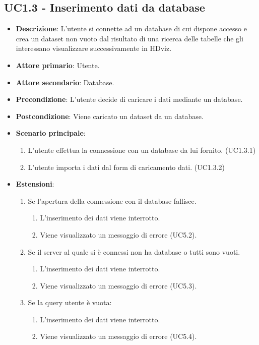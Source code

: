 \subsection{UC1.3 - Inserimento dati da database}
\label{ssub:UC1.3}
\begin{itemize}
    \item \textbf{Descrizione}: L'utente si connette ad un database di cui dispone accesso e 
                                crea un dataset non vuoto dal risultato di una ricerca delle tabelle che gli interessano
                                visualizzare successivamente in HDviz.
    \item \textbf{Attore primario}: Utente.
    
    \item \textbf{Attore secondario}: Database.
    
    \item \textbf{Precondizione}:   L'utente decide di caricare i dati mediante un database. 
    \item \textbf{Postcondizione}:  Viene caricato un dataset da un database. 

	\item \textbf{Scenario principale}:
		\begin{enumerate}
			\item L'utente effettua la connessione con un database da lui fornito. (UC1.3.1)
			\item L'utente importa i dati dal form di caricamento dati. (UC1.3.2)
        \end{enumerate}

    \item \textbf{Estensioni}:
    \begin{enumerate}
        \item Se l'apertura della connessione con il database fallisce.
        \begin{enumerate}
            \item L'inserimento dei dati viene interrotto.
            \item Viene visualizzato un messaggio di errore (UC5.2).
        \end{enumerate}

        \item Se il server al quale si è connessi non ha database o tutti sono vuoti.
        \begin{enumerate}
            \item L'inserimento dei dati viene interrotto.
            \item Viene visualizzato un messaggio di errore (UC5.3).
        \end{enumerate}

        \item Se la query utente è vuota:
        \begin{enumerate}
            \item L'inserimento dei dati viene interrotto.
            \item Viene visualizzato un messaggio di errore (UC5.4).
        \end{enumerate}
    \end{enumerate}
\end{itemize}


